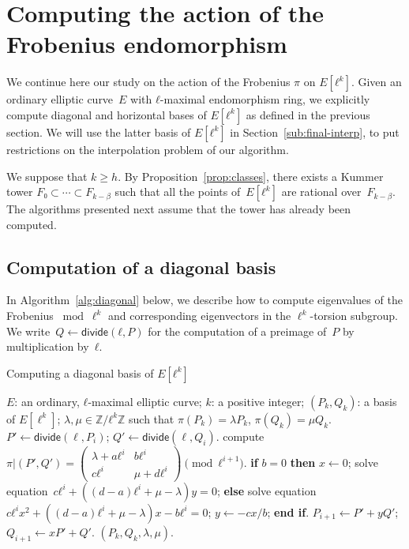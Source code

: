 \documentclass{lms}
\def\sfdiv{\mathsf{divide}}
\begin{document}
\section{Computing the action of the Frobenius endomorphism}
\label{sec:acti-frob-endm}


We continue here our study on the action of the Frobenius $π$ on
$E[ℓ^k]$.  Given an ordinary elliptic curve~$E$ with $ℓ$-maximal endomorphism
ring, we explicitly compute diagonal and horizontal bases of $E[ℓ^k]$
as defined in the previous section.  We will use the latter basis of
$E[ℓ^k]$ in Section~\ref{sub:final-interp}, to put restrictions on the
interpolation problem of our algorithm.

We suppose that $k \geqslant h$. By Proposition~\ref{prop:classes}, there exists a Kummer tower
$F₀⊂\cdots⊂F_{k-\beta}$ such that all the points of~$E[ℓ^k]$ are
rational over~$F_{k-\beta}$. The algorithms presented next assume that
the tower has already been computed.

\subsection{Computation of a diagonal basis}
\label{ss:diagonal}

In Algorithm~\ref{alg:diagonal} below, we describe how to compute
eigenvalues of the Frobenius $\bmod \ell^k$ and corresponding
eigenvectors in the $\ell^{k}$-torsion subgroup.  We
write~$Q ← \sfdiv(ℓ, P)$ for the computation of a preimage of~$P$ by
multiplication by~$ℓ$.

\begin{algorithm}
\caption{\label{alg:diagonal}Computing a diagonal basis of $E[ℓ^k]$}
\begin{algorithmic}[1]
\REQUIRE $E$: an ordinary, $ℓ$-maximal elliptic curve;
$k$: a positive integer;
\ENSURE $(P_k, Q_k )$: a basis of $E[\ell^k]$;
$λ, μ ∈ ℤ/ℓ^k ℤ$
such that $\pi(P_k)= λ P_k$, $ \pi(Q_k)= μ Q_k$.
\STATE\label{alg:diagonal:divide}
  $P' ← \sfdiv(\ell, P_{i})$; $Q' ← \sfdiv (\ell, Q_{i})$.
\STATE\label{alg:diagonal:frobenius}
  compute $\pi|(P',Q')=\left( \begin{smallmatrix}
λ + aℓ^{i} & bℓ^{i}\\
cℓ^{i} & μ + dℓ^{i} \end{smallmatrix} \right) \pmod {ℓ^{i+1}}.$
\STATE\label{alg:diagonal:solve1}
  \textbf{if} $b = 0$ \textbf{then} $x ← 0$;
  solve equation~$c ℓ^{i} + ((d-a) ℓ^{i} + μ-λ) y = 0$;
\STATE\label{alg:diagonal:solve2}
  \textbf{else} solve equation
  $c ℓ^{i} x^2 + ((d-a) ℓ^{i}+ μ-λ) x - b ℓ^{i} = 0$;
  $y ← -cx/b$; \textbf{end if}.
\STATE\label{alg:diagonal:upd-P}
  $P_{i+1} ← P' + y Q'$; $Q_{i+1} ← x P' + Q'$.
\ENDFOR
\RETURN $(P_{k},Q_{k},λ,μ).$
\end{algorithmic}
\end{algorithm}
\end{document}

